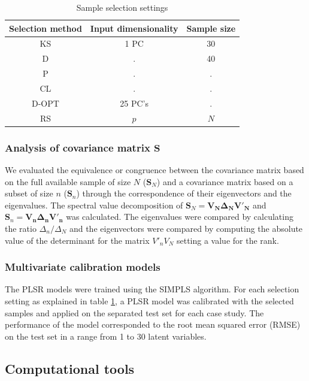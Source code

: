 \documentclass[journal=ancham,manuscript=article]{achemso}
\begin{document}
\begin{table}[t]
\centering
\begin{tabular}{|c|c|c|} 
\hline
Selection method	& Input dimensionality	& Sample size	\\
\hline

KS & 1 PC   & 30  \\
D &  . & 40\\
P &  . & . \\
CL & . & . \\
D-OPT & 25 PC's & .\\
RS & $p$ & $N$\\
\hline


\end{tabular}
\caption{Sample selection settings}
\label{tab_samplesel_settings_exhaustive_search}
\end{table}

\subsubsection*{Analysis of covariance matrix $\mathbf{S}$}

We evaluated the equivalence or congruence between the covariance matrix based on the full available sample of size $N$ ($\mathbf{S}_N$) and a covariance matrix based on a subset of size $n$ ($\mathbf{S}_n$) through the correspondence of their eigenvectors and the eigenvalues. The spectral value decomposition of $\mathbf{S}_N = \mathbf{V_N \Delta_N V'_N}$ and $\mathbf{S}_n = \mathbf{V_n \Delta_n V'_n}$ was calculated. The eigenvalues were compared by calculating the ratio  $\Delta_n/\Delta_N$ and the eigenvectors were compared by computing the absolute value of the determinant for the matrix $V'_nV_N$ setting a value for the rank. 

\subsubsection*{Multivariate calibration models}

The PLSR models were trained using the SIMPLS algorithm. For each selection setting as explained in table \ref{tab_samplesel_settings_exhaustive_search}, a PLSR model was calibrated with the selected samples and applied on the separated test set for each case study. The performance of the model corresponded to the root mean squared error (RMSE) on the test set in a range from 1 to 30 latent variables. 

\subsection*{Computational tools}
\end{document}
